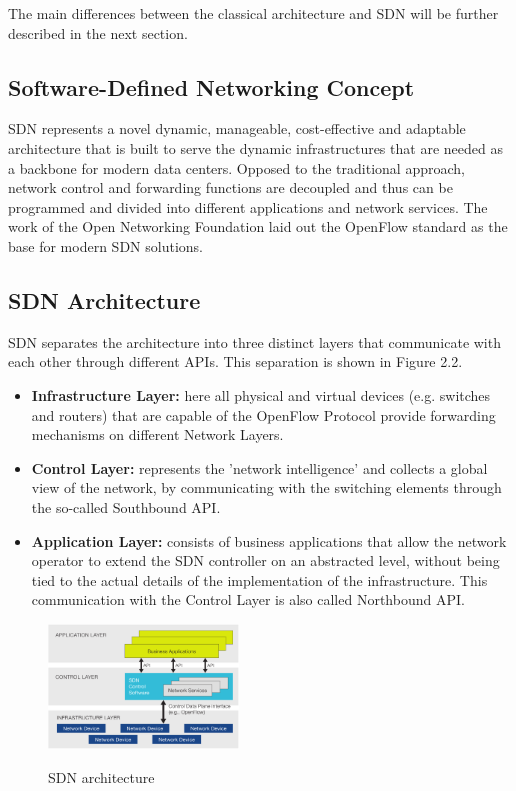 The main differences between the classical architecture and SDN will be further described in the next section.

\subsection{Software-Defined Networking Concept}

SDN represents a novel dynamic, manageable, cost-effective and adaptable architecture \cite{onfdefinition} that is built to serve the dynamic infrastructures that are needed as a backbone for modern data centers. Opposed to the traditional approach, network control and forwarding functions are decoupled and thus can be programmed and divided into different applications and network services.
The work of the Open Networking Foundation laid out the OpenFlow standard as the base for modern SDN solutions.

\subsection{SDN Architecture}

SDN separates the architecture into three distinct layers that communicate with each other through different APIs. This separation is shown in Figure 2.2.

\begin{itemize}
\item \textbf{Infrastructure Layer:} here all physical and virtual devices (e.g. switches and routers) that are capable of the OpenFlow Protocol provide forwarding mechanisms on different Network Layers.
\item \textbf{Control Layer:} represents the 'network intelligence' and collects a global view of the network, by communicating with the switching elements through the so-called Southbound API.
\item \textbf{Application Layer:} consists of business applications that allow the network operator to extend the SDN controller on an abstracted level, without being tied to the actual details of the implementation of the infrastructure. This communication with the Control Layer is also called Northbound API.
\end{itemize}

\begin{figure}[H]
\centering

\includegraphics[width=0.45\textwidth]{images/fundamentals/sdn_logical_architecture.png}

\caption{SDN architecture} \cite{onfdefinition}
\end{figure}

